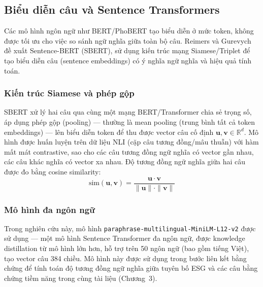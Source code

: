 \subsection{Biểu diễn câu và Sentence Transformers}
\label{subsec:sentence_transformers}

Các mô hình ngôn ngữ như BERT/PhoBERT tạo biểu diễn ở mức token, không được tối ưu cho việc so sánh ngữ nghĩa giữa toàn bộ câu. Reimers và Gurevych~\cite{reimers2019sentence} đề xuất Sentence-BERT (SBERT), sử dụng kiến trúc mạng Siamese/Triplet để tạo biểu diễn câu (sentence embeddings) có ý nghĩa ngữ nghĩa và hiệu quả tính toán.


\subsubsection{Kiến trúc Siamese và phép gộp}

SBERT xử lý hai câu qua cùng một mạng BERT/Transformer chia sẻ trọng số, áp dụng phép gộp (pooling) --- thường là mean pooling (trung bình tất cả token embeddings) --- lên biểu diễn token để thu được vector câu cố định $\mathbf{u}, \mathbf{v} \in \mathbb{R}^d$. Mô hình được huấn luyện trên dữ liệu NLI (cặp câu tương đồng/mâu thuẫn) với hàm mất mát contrastive, sao cho các câu tương đồng ngữ nghĩa có vector gần nhau, các câu khác nghĩa có vector xa nhau. Độ tương đồng ngữ nghĩa giữa hai câu được đo bằng cosine similarity:
\begin{equation}
    \text{sim}(\mathbf{u}, \mathbf{v}) = \frac{\mathbf{u} \cdot \mathbf{v}}{\|\mathbf{u}\| \cdot \|\mathbf{v}\|}
    \label{eq:cosine_sim}
\end{equation}



\subsubsection{Mô hình đa ngôn ngữ}

Trong nghiên cứu này, mô hình \texttt{paraphrase-multilingual-MiniLM-L12-v2} được sử dụng --- một mô hình Sentence Transformer đa ngôn ngữ, được knowledge distillation từ mô hình lớn hơn, hỗ trợ trên 50 ngôn ngữ (bao gồm tiếng Việt), tạo vector câu 384 chiều. Mô hình này được sử dụng trong bước liên kết bằng chứng để tính toán độ tương đồng ngữ nghĩa giữa tuyên bố ESG và các câu bằng chứng tiềm năng trong cùng tài liệu (Chương~3).


